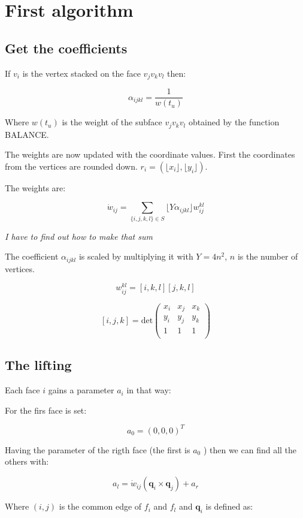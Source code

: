 \documentclass[10pt,a4paper]{article}
\begin{document}
\section{First algorithm}

\subsection{Get the coefficients}

If $v_i$ is the vertex stacked on the face $v_jv_kv_l$ then:

$$\alpha_{ijkl} = \frac{1}{w(t_u)}$$

Where $w(t_u)$ is the weight of the subface $v_jv_kv_l$ obtained by the function BALANCE.

The weights are now updated with the coordinate values. First the coordinates from the vertices are rounded down. $r_i = (\lfloor x_i \rfloor, \lfloor y_i\rfloor)$.

The weights are:

$$\dot{w}_{ij}= \sum_{\{i,j,k,l\}\in S} \lfloor Y \alpha_{ijkl}\rfloor w^{kl}_{ij}$$   

\textit{I have to find out how to make that sum}

The coefficient $\alpha_{ijkl}$ is scaled by multiplying it with $Y = 4 n^2$, $n$ is the number of vertices.


$$w^{kl}_{ij}= [i,k,l][j,k,l]$$

$$
[i,j,k]= \text{det}
 \begin{pmatrix}
  x_i & x_j & x_k\\
  y_i & y_j & y_k\\
  1	  & 1   & 1  \\
 \end{pmatrix}
$$

\subsection{The lifting}

Each face $i$ gains a parameter $a_i$ in that way:

For the firs face is set:

$$a_0 = (0,0,0)^T$$   

Having the parameter of the rigth face (the first is $a_0$ ) then we can find all the others with:

$$a_l= \dot{w}_{ij}(\mathbf{q}_i\times\mathbf{q}_j)+a_r$$

Where $(i,j)$ is the common edge of $f_i$ and $f_l$ and $\mathbf{q}_i$ is defined as:
\end{document}
